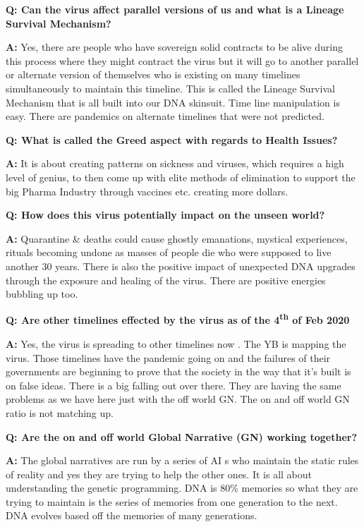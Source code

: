 \textbf{Q: Can the virus affect parallel versions of us and what is a
Lineage Survival Mechanism?}

\textbf{A:} Yes, there are people who have sovereign solid contracts to
be alive during this process where they might contract the virus but it
will go to another parallel or alternate version of themselves who is
existing on many timelines simultaneously to maintain this timeline.
This is called the Lineage Survival Mechanism that is all built into our
DNA skinsuit. Time line manipulation is easy. There are pandemics on
alternate timelines that were not predicted.

\textbf{Q: What is called the Greed aspect with regards to Health
Issues?}

\textbf{A:} It is about creating patterns on sickness and viruses, which
requires a high level of genius, to then come up with elite methods of
elimination to support the big Pharma Industry through vaccines etc.
creating more dollars.

\textbf{Q: How does this virus potentially impact on the unseen world?}

\textbf{A:} Quarantine \& deaths could cause ghostly emanations,
mystical experiences, rituals becoming undone as masses of people die
who were supposed to live another 30 years. There is also the positive
impact of unexpected DNA upgrades through the exposure and healing of
the virus. There are positive energies bubbling up too.

\textbf{Q: Are other timelines effected by the virus as of the
4\textsuperscript{th} of Feb 2020}

\textbf{A:} Yes, the virus is spreading to other timelines now . The YB
is mapping the virus. Those timelines have the pandemic going on and the
failures of their governments are beginning to prove that the society in
the way that it's built is on false ideas. There is a big falling out
over there. They are having the same problems as we have here just with
the off world GN. The on and off world GN ratio is not matching up.

\textbf{Q: Are the on and off world Global Narrative (GN) working
together? }

\textbf{A:} The global narratives are run by a series of AI s who
maintain the static rules of reality and yes they are trying to help the
other ones. It is all about understanding the genetic programming. DNA
is 80\% memories so what they are trying to maintain is the series of
memories from one generation to the next. DNA evolves based off the
memories of many generations.


